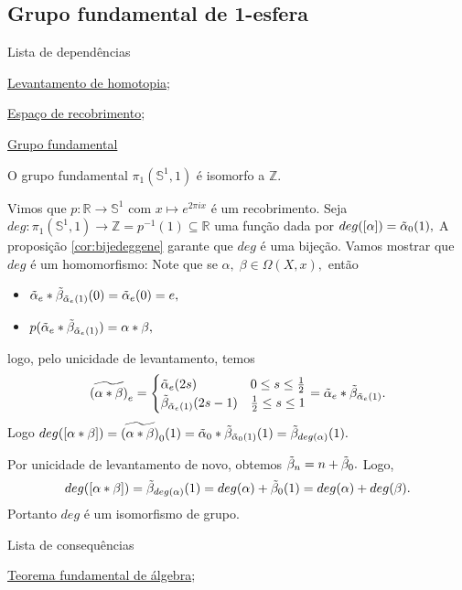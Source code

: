 \subsection{Grupo fundamental de 1-esfera}
\label{grupo-fundamental-de-S1-prop}
\begin{titlemize}{Lista de dependências}
	\item \hyperref[levantamento-de-homotopia-prop]{Levantamento de homotopia};\\ %
	\item \hyperref[espaco-de-recobrimento-def]{Espaço de recobrimento};\\
    \item \hyperref[grupo-fundamental]{Grupo fundamental}
\end{titlemize}

\begin{thm}
    O grupo fundamental $\pi_1(\mathbb{S}^1,1)$ é isomorfo a $\mathbb{Z}.$ 
\end{thm}

\begin{dem}
Vimos que $p:\mathbb{R}\rightarrow \mathbb{S}^1$ com $x\mapsto e^{2\pi i x}$ é um recobrimento. Seja $deg:\pi_1(\mathbb{S}^1,1)\rightarrow \mathbb{Z}=p^{-1}(1)\subseteq \mathbb{R}$ uma função dada por $deg([\alpha])=\Tilde{\alpha}_0(1),$ A proposição \ref{cor:bijedeggene} garante que $deg$ é uma bijeção. Vamos mostrar que $deg$ é um homomorfismo: Note que se $\alpha,\;\beta\in \Omega(X,x),$ então
\begin{itemize}
    \item $\Tilde{\alpha}_e*\Tilde{\beta}_{\Tilde{\alpha}_e (1)}(0)=\Tilde{\alpha}_e(0)=e,$
    \item $p(\Tilde{\alpha}_e*\Tilde{\beta}_{\Tilde{\alpha}_e (1)})=\alpha *\beta,$
\end{itemize}
logo, pelo unicidade de levantamento, temos 
\begin{align*}
\widetilde{(\alpha*\beta)}_e=\begin{cases}
    \Tilde{\alpha}_e (2s)\qquad& 0\le s\le \frac{1}{2}\\
    \Tilde{\beta}_{\Tilde{\alpha}_e (1)}(2s-1)&\frac{1}{2}\le s\le 1
    \end{cases}=\Tilde{\alpha}_e*\Tilde{\beta}_{\Tilde{\alpha}_e (1)}.
\end{align*}
Logo $deg([\alpha*\beta])=\widetilde{(\alpha*\beta)}_0 (1)=\Tilde{\alpha}_0*\Tilde{\beta}_{\Tilde{\alpha}_0 (1)}(1)=\Tilde{\beta}_{deg(\alpha)}(1).$

Por unicidade de levantamento de novo, obtemos $\Tilde{\beta}_n=n+\Tilde{\beta}_0.$ Logo,
\[deg([\alpha*\beta])=\Tilde{\beta}_{deg(\alpha)}(1)=deg(\alpha)+\Tilde{\beta}_0 (1)=deg(\alpha)+deg(\beta).\]
Portanto $deg$ é um isomorfismo de grupo.
\end{dem}

\begin{titlemize}{Lista de consequências}
	\item \hyperref[]{Teorema fundamental de álgebra};\\ %
\end{titlemize}
